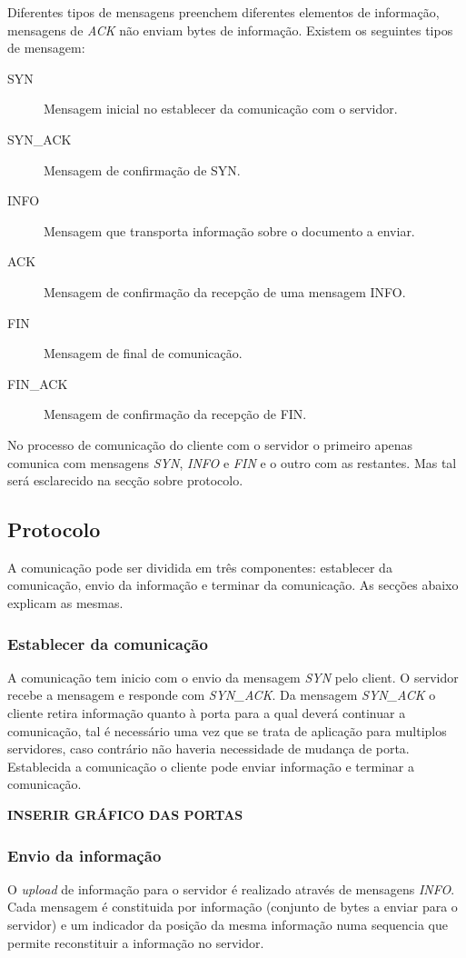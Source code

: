 \documentclass{llncs}
\begin{document}
Diferentes tipos de mensagens preenchem diferentes elementos de informação, mensagens de \textit{ACK} não enviam bytes de informação. Existem os seguintes tipos de mensagem:


\begin{description}
	\item[SYN] Mensagem inicial no establecer da comunicação com o servidor.
	\item[SYN\_ACK] Mensagem de confirmação de SYN.
	\item[INFO] Mensagem que transporta informação sobre o documento a enviar.
	\item[ACK] Mensagem de confirmação da recepção de uma mensagem INFO.
	\item[FIN] Mensagem de final de comunicação.
	\item[FIN\_ACK] Mensagem de confirmação da recepção de FIN.
\end{description}


No processo de comunicação do cliente com o servidor o primeiro apenas comunica com mensagens \textit{SYN}, \textit{INFO} e \textit{FIN} e o outro com as restantes. Mas tal será esclarecido na secção sobre protocolo.


\subsection{Protocolo}
A comunicação pode ser dividida em três componentes: establecer da comunicação, envio da informação e terminar da comunicação. As secções abaixo explicam as mesmas.

\subsubsection{Establecer da comunicação}
A comunicação tem inicio com o envio da mensagem \textit{SYN} pelo client. O servidor recebe a mensagem e responde com \textit{SYN\_ACK}. Da mensagem \textit{SYN\_ACK} o cliente retira informação quanto à porta para a qual deverá continuar a comunicação, tal é necessário uma vez que se trata de aplicação para multiplos servidores, caso contrário não haveria necessidade de mudança de porta. Establecida a comunicação o cliente pode enviar informação e terminar a comunicação.


\textbf{INSERIR GRÁFICO DAS PORTAS}


\subsubsection{Envio da informação}
O \textit{upload} de informação para o servidor é realizado através de mensagens \textit{INFO}. Cada mensagem é constituida por informação (conjunto de bytes a enviar para o servidor) e um indicador da posição da mesma informação numa sequencia que permite reconstituir a informação no servidor.
\end{document}

